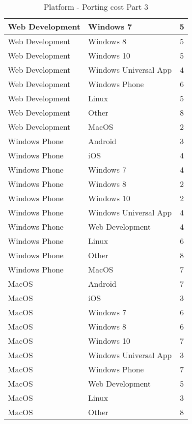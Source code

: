 \begin{table}[h]
	\centering 
	\setlength{\tabcolsep}{4pt}
	\begin{tabular}{|l|l|c|}\hline
	Web Development  			& Windows 7 				&5     		\\ \hline
	Web Development  			& Windows 8 				& 5     		\\ \hline
	Web Development  			& Windows 10				& 5     		\\ \hline
	Web Development  			& Windows Universal App 				& 4     		\\ \hline
	Web Development  			& Windows Phone 				& 6     		\\ \hline
	Web Development  			& Linux 				& 5     		\\ \hline
	Web Development  			& Other 				& 8     		\\ \hline
	Web Development  			& MacOS 				& 2     		\\ \hline
	Windows Phone			& Android 				&3     		\\ \hline
	Windows Phone  			& iOS 				& 4     		\\ \hline
	Windows Phone   			& Windows 7 				&4     		\\ \hline
	Windows Phone   			& Windows 8 				& 2     		\\ \hline
	Windows Phone   			& Windows 10				& 2     		\\ \hline
	Windows Phone   			& Windows Universal App 				& 4     		\\ \hline
	Windows Phone   			& Web Development 				& 4    		\\ \hline
	Windows Phone   			& Linux 				& 6     		\\ \hline
	Windows Phone   			& Other 				& 8     		\\ \hline
	Windows Phone   			& MacOS 				& 7     		\\ \hline
	MacOS  			& Android 				& 7     		\\ \hline
	MacOS  			& iOS 				& 3     		\\ \hline
	MacOS  			& Windows 7 				& 6     		\\ \hline
	MacOS  			& Windows 8 				& 6     		\\ \hline
	MacOS  			& Windows 10				& 7     		\\ \hline
	MacOS  			& Windows Universal App 				& 3     		\\ \hline
	MacOS  			& Windows Phone 				& 7     		\\ \hline
	MacOS  			& Web Development 				& 5     		\\ \hline
	MacOS  			& Linux 				& 3     		\\ \hline
	MacOS  			& Other 				& 8     		\\ \hline
\end{tabular} 
\caption{Platform - Porting cost Part 3} 
\label{platformportingcosts3} 
\end{table}
